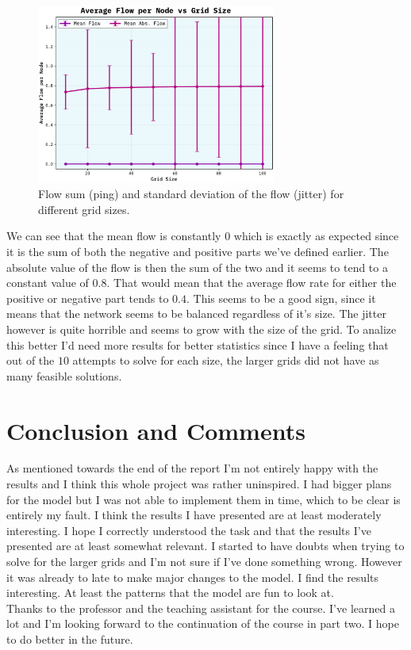 \documentclass[10pt, titlepage, a4paper]{article}
\begin{document}
\begin{figure}[H]
    \centering
    \includegraphics[width=0.7\textwidth]{../Images/flow-sum.pdf}
    \caption{Flow sum (ping) and standard deviation of the flow (jitter) for different grid sizes.}
    \label{fig:ping-jitter}
\end{figure}

We can see that the mean flow is constantly $0$ which is exactly as expected since it is the sum of both the 
negative and positive parts we've defined earlier. The absolute value of the flow is then the sum of the two and 
it seems to tend to a constant value of $0.8$. That would mean that the average flow rate for either the positive or 
negative part tends to $0.4$. This seems to be a good sign, since it means that the network seems to be balanced regardless of 
it's size. The jitter however is quite horrible and seems to grow with the size of the grid. To analize this better I'd need 
more results for better statistics since I have a feeling that out of the $10$ attempts to solve for each size, the larger grids 
did not have as many feasible solutions. \\

\section{Conclusion and Comments}
As mentioned towards the end of the report I'm not entirely happy with the results and I think this whole project 
was rather uninspired. I had bigger plans for the model but I was not able to implement them in time, which to be clear is entirely 
my fault. I think the results I have presented are at least moderately interesting. I hope I correctly 
understood the task and that the results I've presented are at least somewhat relevant. I started to have doubts when trying 
to solve for the larger grids and I'm not sure if I've done something wrong. However it was already to late to make 
major changes to the model. I find the results interesting. At least the patterns that the model are fun to look at.\\ 

Thanks to the professor and the teaching assistant for the course. I've learned a lot and I'm looking forward to the continuation 
of the course in part two. I hope to do better in the future.

\newpage



\end{document}
